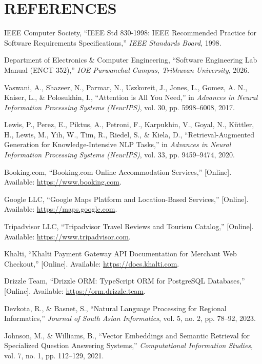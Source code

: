 \documentclass[12pt,a4paper]{report}
\begin{document}
\chapter*{REFERENCES}

\begin{enumerate}[label={[\arabic*]}]
    \item IEEE Computer Society, ``IEEE Std 830-1998: IEEE Recommended Practice for Software Requirements Specifications,'' \emph{IEEE Standards Board}, 1998.
    \item Department of Electronics \& Computer Engineering, ``Software Engineering Lab Manual (ENCT 352),'' \emph{IOE Purwanchal Campus, Tribhuvan University}, 2026.
    \item Vaswani, A., Shazeer, N., Parmar, N., Uszkoreit, J., Jones, L., Gomez, A. N., Kaiser, L., \& Polosukhin, I., ``Attention is All You Need,'' in \emph{Advances in Neural Information Processing Systems (NeurIPS)}, vol. 30, pp. 5998--6008, 2017.
    \item Lewis, P., Perez, E., Piktus, A., Petroni, F., Karpukhin, V., Goyal, N., K\"{u}ttler, H., Lewis, M., Yih, W., Tim, R., Riedel, S., \& Kiela, D., ``Retrieval-Augmented Generation for Knowledge-Intensive NLP Tasks,'' in \emph{Advances in Neural Information Processing Systems (NeurIPS)}, vol. 33, pp. 9459--9474, 2020.
    \item Booking.com, ``Booking.com Online Accommodation Services,'' [Online]. Available: \url{https://www.booking.com}.
    \item Google LLC, ``Google Maps Platform and Location-Based Services,'' [Online]. Available: \url{https://maps.google.com}.
    \item Tripadvisor LLC, ``Tripadvisor Travel Reviews and Tourism Catalog,'' [Online]. Available: \url{https://www.tripadvisor.com}.
    \item Khalti, ``Khalti Payment Gateway API Documentation for Merchant Web Checkout,'' [Online]. Available: \url{https://docs.khalti.com}.
    \item Drizzle Team, ``Drizzle ORM: TypeScript ORM for PostgreSQL Databases,'' [Online]. Available: \url{https://orm.drizzle.team}.
    \item Devkota, R., \& Basnet, S., ``Natural Language Processing for Regional Informatics,'' \emph{Journal of South Asian Informatics}, vol. 5, no. 2, pp. 78--92, 2023.
    \item Johnson, M., \& Williams, B., ``Vector Embeddings and Semantic Retrieval for Specialized Question Answering Systems,'' \emph{Computational Information Studies}, vol. 7, no. 1, pp. 112--129, 2021.

\end{enumerate}
\end{document}
